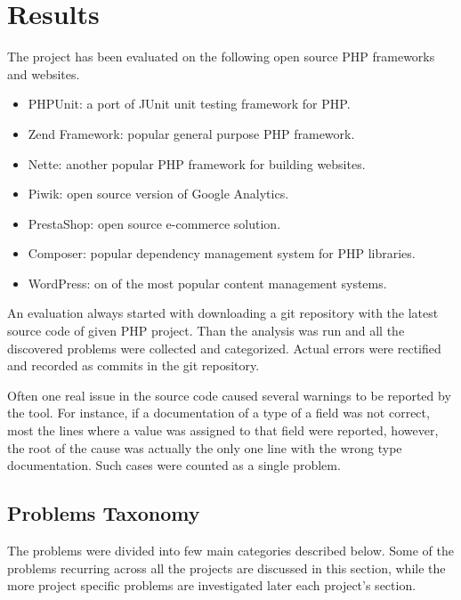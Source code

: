 \chapter{Results}

The project has been evaluated on the following open source PHP frameworks and 
websites.

\begin{itemize}
    \item PHPUnit: a port of JUnit unit testing framework for PHP. 
    \item Zend Framework: popular general purpose PHP framework. 
    \item Nette: another popular PHP framework for building websites.
    \item Piwik: open source version of Google Analytics. 
    \item PrestaShop: open source e-commerce solution. 
    \item Composer: popular dependency management system for PHP libraries. 
    \item WordPress: on of the most popular content management systems.
\end{itemize}

An evaluation always started with downloading a git repository with the 
latest source code of given PHP project. Than the analysis was run and 
all the discovered problems were collected and categorized.
Actual errors were rectified and recorded as commits in the 
git repository. 

Often one real issue in the source code caused several 
warnings to be reported by the tool. For instance, if a documentation 
of a type of a field was not correct, most the lines where 
a value was assigned to that field were reported, however, the 
root of the cause was actually the only one line with the 
wrong type documentation. Such cases were counted as a 
single problem.

\section{Problems Taxonomy}

The problems were divided into few main categories 
described below. Some of the problems recurring 
across all the projects are discussed in this section, 
while the more project specific problems are 
investigated later each project's section.

